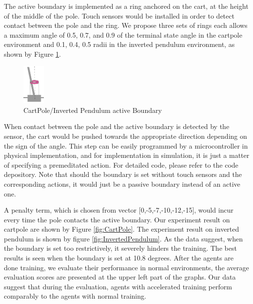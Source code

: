 \documentclass[journal]{IEEEtran}
\begin{document}
The active boundary is implemented as a ring anchored on the cart, at the height of the middle of the pole. Touch sensors would be installed in order to detect contact between the pole and the ring. We propose three sets of rings each allows a maximum angle of 0.5, 0.7, and 0.9 of the terminal state angle in the cartpole environment and 0.1, 0.4, 0.5 radii in the inverted pendulum environment, as shown by Figure \ref{fig:cartpolePB}. 

\begin{figure}
     \centering
      \includegraphics[width=0.1\textwidth]{cartpole1.png}
      \caption{CartPole/Inverted Pendulum active Boundary}
      \label{fig:cartpolePB}
\end{figure}
When contact between the pole and the active boundary is detected by the sensor, the cart would be pushed towards the appropriate direction depending on the sign of the angle. This step can be easily programmed by a microcontroller in physical implementation, and for implementation in simulation, it is just a matter of specifying a premeditated action. For detailed code, please refer to the code depository. Note that should the boundary is set without touch sensors and the corresponding actions, it would just be a passive boundary instead of an active one. 

A penalty term, which is chosen from vector [0,-5,-7,-10,-12,-15], would incur every time the pole contacts the active boundary. Our experiment result on cartpole are shown by Figure \ref{fig:CartPole}. The experiment result on inverted pendulum is shown by figure \ref{fig:InvertedPendulum}. As the data suggest, when the boundary is set too restrictively, it severely hinders the training. The best results is seen when the boundary is set at 10.8 degrees. After the agents are done training, we evaluate their performance in normal environments, the average evaluation scores are presented at the upper left part of the graphs. Our data suggest that during the evaluation, agents with accelerated training perform comparably to the agents with normal training.
\end{document}
